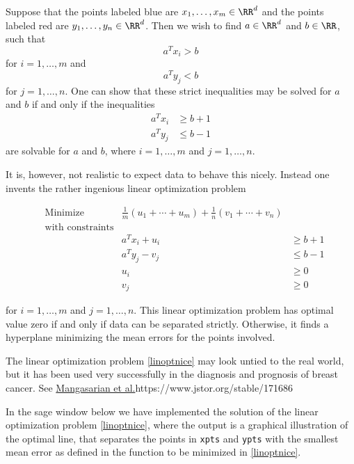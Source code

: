 \documentclass{article}
\begin{document}
  Suppose that the points labeled blue are $x_1, \dots, x_m\in \RR^d$ and
  the points labeled red are $y_1, \dots, y_n\in \RR^d$. Then we wish to
  find $a\in \RR^d$ and $b\in \RR$, such that
  $$
  a^T x_i > b
  $$
  for $i = 1, \dots, m$ and
  $$
  a^T y_j < b
  $$
  for $j = 1, \dots, n$. One can show that these strict inequalities may be solved 
  for $a$ and $b$ if and only if the inequalities
  \begin{align*}
  a^T x_i &\geq b + 1\\
  a^T y_j &\leq b - 1
  \end{align*}
  are solvable for $a$ and $b$, where $i = 1, \dots, m$ and $j = 1, \dots, n$.
  
  It is, however, not realistic to expect data to behave this nicely. Instead one invents
  the rather ingenious linear optimization problem

  \begin{align}\label{linoptnice}
    &\text{Minimize} &\frac{1}{m}(u_1 + \cdots + u_m) + \frac{1}{n}(v_1 + \cdots + v_n)\\
    &\text{with constraints}\\
    &&a^T x_i + u_i&\geq b + 1\\
    &&a^T y_j - v_j &\leq b - 1\\
    &&u_i&\geq 0\\
    &&v_j&\geq 0
  \end{align}
  
  for $i = 1, \dots, m$ and $j = 1, \dots, n$. This linear optimization problem has optimal value zero
  if and only if data can be separated strictly. Otherwise, it finds a hyperplane minimizing the mean errors
  for the points involved.

  The linear optimization problem \eqref{linoptnice} may look untied to the real world, but it has
  been used very successfully in the diagnosis and prognosis of breast
  cancer. See \url{Mangasarian et al.}{https://www.jstor.org/stable/171686}

  In the sage window below we have implemented the solution of the
  linear optimization problem \eqref{linoptnice}, where the output is
  a graphical illustration of the optimal line, that separates the
  points in \texttt{xpts} and \texttt{ypts} with the smallest mean
  error as defined in the function to be minimized in \eqref{linoptnice}.
  
\end{document}
